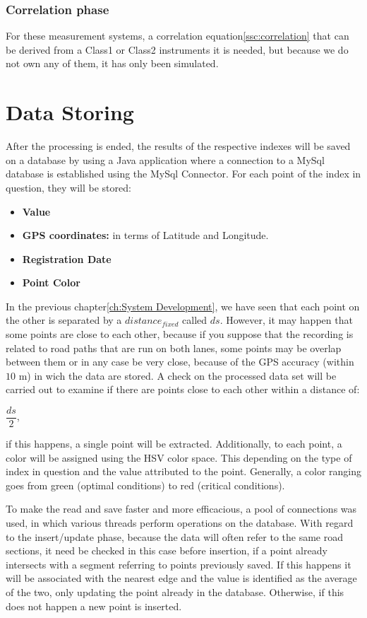 \documentclass[tesi]{subfiles}
\begin{document}
\subsubsection{Correlation phase}
For these measurement systems, a correlation equation\ref{ssc:correlation} that can be derived from a Class1 or Class2 instruments it is needed, but because we do not own any of them, it has only been simulated.

\clearpage
\section{Data Storing}\label{sc:data_storing}
After the processing is ended, the results of the respective indexes will be saved on a database by using a Java application where a connection to a MySql database is established using the MySql Connector.
For each point of the index in question, they will be stored:
\begin{itemize}
\item \textbf{Value}
\item \textbf{GPS coordinates:} in terms of Latitude and Longitude.
\item \textbf{Registration Date}
\item \textbf{Point Color}
\end{itemize}
In the previous chapter\ref{ch:System Development}, we have seen that each point on the other is separated by a $distance_{fixed}$ called $ds$. However, it may happen that some points are close to each other, because if you suppose that the recording is related to road paths that are run on both lanes, some points may be overlap between them or in any case be very close, because of the GPS accuracy (within $10$ m) in wich the data are stored. A check on the processed data set will be carried out to examine if there are points close to each other within a distance of:

\begin{center}
$\dfrac{ds}{2}$,
\end{center}

if this happens, a single point will be extracted.
Additionally, to each point, a color will be assigned using the HSV color space. This depending on the type of index in question and the value attributed to the point. Generally, a color ranging goes from green (optimal conditions) to red (critical conditions).

To make the read and save faster and more efficacious, a pool of connections was used, in which various threads perform operations on the database. With regard to the insert/update phase, because the data will often refer to the same road sections, it need be checked in this case before insertion, if a point already intersects with a segment referring to points previously saved. If this happens it will be associated with the nearest edge and the value is identified as the average of the two, only updating the point already in the database. Otherwise, if this does not happen a new point is inserted.
\end{document}
